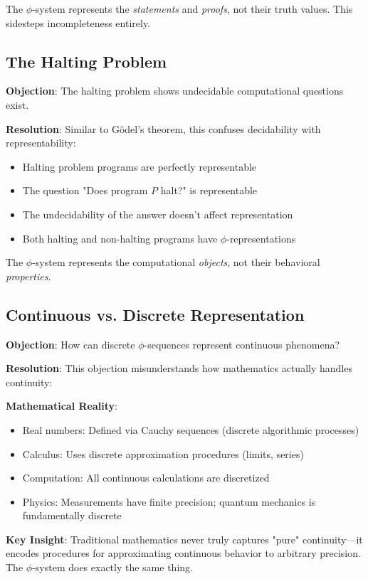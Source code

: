 \documentclass[12pt,letterpaper]{article}
\begin{document}
The $\phi$-system represents the \textit{statements} and \textit{proofs}, not their truth values. This sidesteps incompleteness entirely.

\subsection{The Halting Problem}

\textbf{Objection}: The halting problem shows undecidable computational questions exist.

\textbf{Resolution}: Similar to Gödel's theorem, this confuses decidability with representability:

\begin{itemize}
\item Halting problem programs are perfectly representable
\item The question "Does program $P$ halt?" is representable
\item The undecidability of the answer doesn't affect representation
\item Both halting and non-halting programs have $\phi$-representations
\end{itemize}

The $\phi$-system represents the computational \textit{objects}, not their behavioral \textit{properties}.

\subsection{Continuous vs. Discrete Representation}

\textbf{Objection}: How can discrete $\phi$-sequences represent continuous phenomena?

\textbf{Resolution}: This objection misunderstands how mathematics actually handles continuity:

\textbf{Mathematical Reality}:
\begin{itemize}
\item Real numbers: Defined via Cauchy sequences (discrete algorithmic processes)
\item Calculus: Uses discrete approximation procedures (limits, series)
\item Computation: All continuous calculations are discretized
\item Physics: Measurements have finite precision; quantum mechanics is fundamentally discrete
\end{itemize}

\textbf{Key Insight}: Traditional mathematics never truly captures "pure" continuity—it encodes procedures for approximating continuous behavior to arbitrary precision. The $\phi$-system does exactly the same thing.
\end{document}
